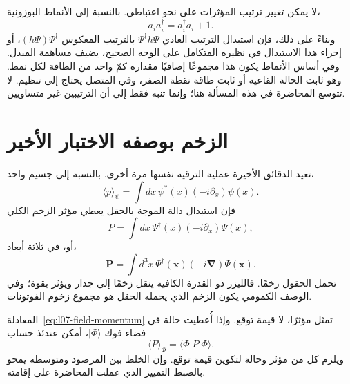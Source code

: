 لا يمكن تغيير ترتيب المؤثرات على نحو اعتباطي. بالنسبة إلى الأنماط البوزونية،
\begin{equation}
a_i a_i^\dagger=a_i^\dagger a_i+1.
\end{equation}
وبناءً على ذلك، فإن استبدال الترتيب العادي \(\Psi^\dagger h\Psi\) بالترتيب المعكوس \((h\Psi)\Psi^\dagger\)، أو إجراء هذا الاستبدال في نظيره المتكامل على الوجه الصحيح، يضيف مساهمة المبدل. وفي أساس الأنماط يكون هذا مجموعًا إضافيًا مقداره كمّ واحد من الطاقة لكل نمط. وهو ثابت الحالة القاعية أو ثابت طاقة نقطة الصفر، وفي المتصل يحتاج إلى تنظيم. لا تتوسع المحاضرة في هذه المسألة هنا؛ وإنما تنبه فقط إلى أن الترتيبين غير متساويين.

\begin{classroomqa}
\end{classroomqa}

\section{الزخم بوصفه الاختبار الأخير}

تعيد الدقائق الأخيرة عملية الترقية نفسها مرة أخرى. بالنسبة إلى جسيم واحد،
\begin{equation}
\langle p\rangle_\psi
=\int dx\,\psi^*(x)\left(-i\partial_x\right)\psi(x).
\label{eq:l07-one-particle-momentum}
\end{equation}
فإن استبدال دالة الموجة بالحقل يعطي مؤثر الزخم الكلي
\begin{equation}
P=\int dx\,\Psi^\dagger(x)\left(-i\partial_x\right)\Psi(x),
\label{eq:l07-field-momentum}
\end{equation}
أو، في ثلاثة أبعاد،
\begin{equation}
\mathbf P=\int d^3x\,\Psi^\dagger(\mathbf x)
\left(-i\boldsymbol\nabla\right)\Psi(\mathbf x).
\end{equation}
تحمل الحقول زخمًا. فالليزر ذو القدرة الكافية ينقل زخمًا إلى جدار ويؤثر بقوة؛ وفي الوصف الكمومي يكون الزخم الذي يحمله الحقل هو مجموع زخوم الفوتونات.

المعادلة~\eqref{eq:l07-field-momentum} تمثل مؤثرًا، لا قيمة توقع. وإذا أُعطيت حالة في فضاء فوك \(|\Phi\rangle\)، أمكن عندئذ حساب
\begin{equation}
\langle P\rangle_\Phi=\langle\Phi|P|\Phi\rangle.
\end{equation}
ويلزم كل من مؤثر وحالة لتكوين قيمة توقع. وإن الخلط بين المرصود ومتوسطه يمحو بالضبط التمييز الذي عملت المحاضرة على إقامته.

